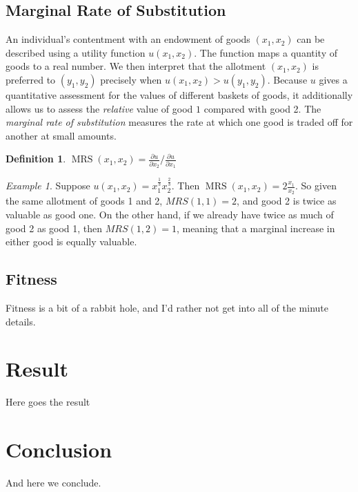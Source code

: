 \documentclass[titlepage, hidelinks, 12pt]{article}
\theoremstyle{plain}
\theoremstyle{remark}
\newtheorem*{example}{Example}
\theoremstyle{definition}
\newtheorem{definition}[theorem]{Definition}
\DeclareMathOperator{\MRS}{MRS}
\begin{document}
\subsection{Marginal Rate of Substitution}
An individual's contentment with an endowment of goods $(x_1, x_2)$ can be described using a utility function $u(x_1,x_2)$. The function
maps a quantity of goods to a real number. We then interpret that the allotment $(x_1, x_2)$ is preferred to $(y_1, y_2)$ precisely when
$u(x_1, x_2) > u(y_1, y_2)$. Because $u$ gives a quantitative assessment for the values of different baskets of goods, it additionally allows
us to assess the \textit{relative} value of good $1$ compared with good 2. The \textit{marginal rate of substitution} measures the rate at which
one good is traded off for another at small amounts. 
\begin{definition}
    $\MRS(x_1, x_2) = \frac{\partial u}{\partial x_2}\bigg/\frac{\partial u}{\partial x_1 }$
    \label{def:MRS}
\end{definition}

\begin{example}
    Suppose $u(x_1, x_2) = x_1^{\frac{1}{3}}x_2^{\frac{2}{3}}$. Then $\MRS(x_1, x_2) = 2\frac{x_1}{x_2}$. So given the same allotment of goods 1 and 2,
    $MRS(1, 1) = 2$, and good 2 is twice as valuable as good one. On the other hand, if we already have twice as much of good 2 as good 1, then 
    $MRS(1, 2) = 1$, meaning that a marginal increase in either good is equally valuable. 
\end{example}

\subsection{Fitness}
Fitness is a bit of a rabbit hole, and I'd rather not get into all of the minute details. 

\section{Result}
Here goes the result

\section{Conclusion}

And here we conclude.  
\end{document}
